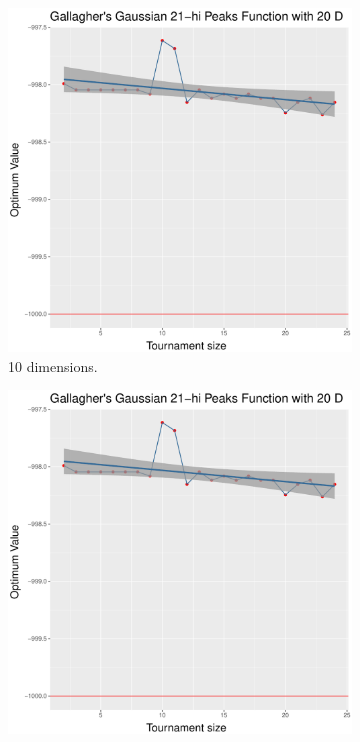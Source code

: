 \begin{figure}[t]
	\begin{subfigure}[b]{0.33\textwidth}
		\centering
		\includegraphics[width=\textwidth]{img/multimodal_sbx_22_dim_20.pdf}
		\caption{10 dimensions.}
	\end{subfigure}
	\begin{subfigure}[b]{0.33\textwidth}
		\centering
			\includegraphics[width=\textwidth]{img/multimodal_sbx_22_dim_20.pdf}

\end{subfigure}
\end{figure}
